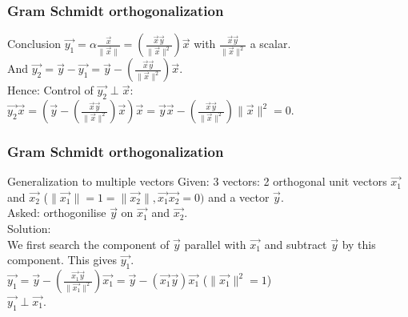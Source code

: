 \begin{frame}
	\frametitle{Gram Schmidt orthogonalization}
	\begin{block}{Conclusion}
		$\overrightarrow{y_1}=\alpha\frac{\overrightarrow{x}}{\|\overrightarrow{x}\|}=(\frac{\overrightarrow{x}\overrightarrow{y}}{\|\overrightarrow{x}\|^2})\overrightarrow{x}$ with $\frac{\overrightarrow{x}\overrightarrow{y}}{\|\overrightarrow{x}\|^2}$ a scalar.\\
		And $\overrightarrow{y_2}=\overrightarrow{y}-\overrightarrow{y_1}=\overrightarrow{y}-(\frac{\overrightarrow{x}\overrightarrow{y}}{\|\overrightarrow{x}\|^2})\overrightarrow{x}$.\\
		Hence:
		Control of $\overrightarrow{y_2}\perp\overrightarrow{x}$:\\
		$\overrightarrow{y_2}\overrightarrow{x}=(\overrightarrow{y}-(\frac{\overrightarrow{x}\overrightarrow{y}}{\|\overrightarrow{x}\|^2})\overrightarrow{x})\overrightarrow{x}=\overrightarrow{y}\overrightarrow{x}-(\frac{\overrightarrow{x}\overrightarrow{y}}{\|\overrightarrow{x}\|^2})\|\overrightarrow{x}\|^2=0$.
	\end{block} 
\end{frame}

\begin{frame}
	\frametitle{Gram Schmidt orthogonalization}
	\begin{block}{Generalization to multiple vectors}
		Given: 3 vectors: 2 orthogonal unit vectors $\overrightarrow{x_1}$ and $\overrightarrow{x_2}$ ($\|\overrightarrow{x_1}\|=1=\|\overrightarrow{x_2}\|,\overrightarrow{x_1}\overrightarrow{x_2}=0)$ and a vector $\overrightarrow{y}$.\\
		Asked: orthogonilise $\overrightarrow{y}$ on $\overrightarrow{x_1}$ and $\overrightarrow{x_2}$.\\
		Solution:\\
		We first search the component of $\overrightarrow{y}$ parallel with $\overrightarrow{x_1}$ and subtract $\overrightarrow{y}$ by this component. This gives $\overrightarrow{y_1}$.\\
		$\overrightarrow{y_1}=\overrightarrow{y}-(\frac{\overrightarrow{x_1}\overrightarrow{y}}{\|\overrightarrow{x_1}\|^2})\overrightarrow{x_1}=\overrightarrow{y}-(\overrightarrow{x_1}\overrightarrow{y})\overrightarrow{x_1}$ ($\|\overrightarrow{x_1}\|^2=1$)\\
		$\overrightarrow{y_1}\perp\overrightarrow{x_1}$.
	\end{block} 
\end{frame}

